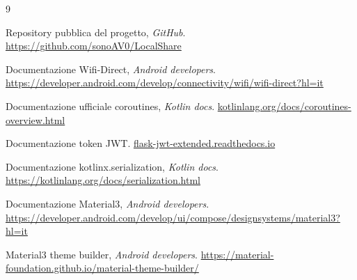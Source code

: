 \begin{thebibliography}{9}

    Repository pubblica del progetto, \emph{GitHub}.
    \url{https://github.com/sonoAV0/LocalShare}

    Documentazione Wifi-Direct, \emph{Android developers}.
    \url{https://developer.android.com/develop/connectivity/wifi/wifi-direct?hl=it}

    Documentazione ufficiale coroutines, \emph{Kotlin docs}.
    \url{kotlinlang.org/docs/coroutines-overview.html}

    Documentazione token JWT.
    \url{flask-jwt-extended.readthedocs.io}

    Documentazione kotlinx.serialization, \emph{Kotlin docs}.
    \url{https://kotlinlang.org/docs/serialization.html}

    Documentazione Material3, \emph{Android developers}.
    \url{https://developer.android.com/develop/ui/compose/designsystems/material3?hl=it}

    Material3 theme builder, \emph{Android developers}.
    \url{https://material-foundation.github.io/material-theme-builder/}

    
\end{thebibliography}

